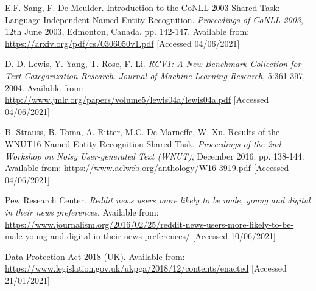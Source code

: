 \begin{thebibliography}{9}
E.F. Sang, F. De Meulder. Introduction to the CoNLL-2003 Shared Task: Language-Independent Named Entity Recognition. \textit{Proceedings of CoNLL-2003}, 12th June 2003, Edmonton, Canada. pp. 142-147. Available from: \url{https://arxiv.org/pdf/cs/0306050v1.pdf} [Accessed 04/06/2021]

D. D. Lewis, Y. Yang, T. Rose, F. Li. \textit{RCV1: A New Benchmark Collection for Text Categorization Research}. \textit{Journal of Machine Learning Research}, 5:361-397, 2004. Available from: \url{http://www.jmlr.org/papers/volume5/lewis04a/lewis04a.pdf} [Accessed 04/06/2021]

B. Strauss, B. Toma, A. Ritter, M.C. De Marneffe, W. Xu. Results of the WNUT16 Named Entity Recognition Shared Task. \textit{Proceedings of the 2nd Workshop on Noisy User-generated Text (WNUT)}, December 2016. pp. 138-144. Available from: \url{https://www.aclweb.org/anthology/W16-3919.pdf} [Accessed 04/06/2021]

Pew Research Center. \textit{Reddit news users more likely to be male, young and digital in their news preferences}. Available from: \url{https://www.journalism.org/2016/02/25/reddit-news-users-more-likely-to-be-male-young-and-digital-in-their-news-preferences/} [Accessed 10/06/2021]

Data Protection Act 2018 (UK). Available from: \url{https://www.legislation.gov.uk/ukpga/2018/12/contents/enacted} [Accessed 21/01/2021]

\end{thebibliography}